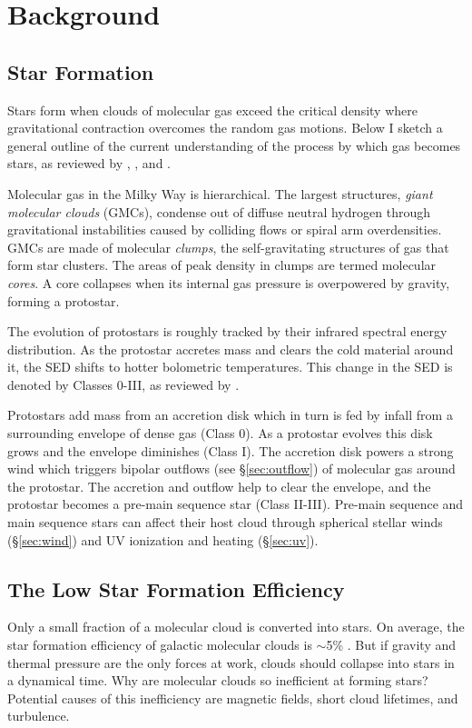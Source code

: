 \section{Background}\label{sec:bkgrd}

\subsection{Star Formation}\label{sec:sf}
Stars form when clouds of molecular gas exceed the critical density where gravitational contraction overcomes the random gas motions. Below I sketch a general outline of the current understanding of the process by which gas becomes stars, as reviewed by \cite{McKee_2007}, \cite{Draine11}, and \cite{Dunham_2014}. 

Molecular gas in the Milky Way is hierarchical. The largest structures, \textit{giant molecular clouds} (GMCs), condense out of diffuse neutral hydrogen through gravitational instabilities caused by colliding flows or spiral arm overdensities. GMCs are made of molecular \textit{clumps}, the self-gravitating structures of gas that form star clusters. The areas of peak density in clumps are termed molecular \textit{cores}. A core collapses when its internal gas pressure is overpowered by gravity, forming a protostar.

The evolution of protostars is roughly tracked by their infrared spectral energy distribution. As the protostar accretes mass and clears the cold material around it, the SED shifts to hotter bolometric temperatures. This change in the SED is denoted by Classes 0-III, as reviewed by \cite{Andre00}.

Protostars add mass from an accretion disk which in turn is fed by infall from a surrounding envelope of dense gas (Class 0). As a protostar evolves this disk grows and the envelope diminishes (Class I). The accretion disk powers a strong wind which triggers bipolar outflows (see \S\ref{sec:outflow}) of molecular gas around the protostar. The accretion and outflow help to clear the envelope, and the protostar becomes a pre-main sequence star (Class II-III). Pre-main sequence and main sequence stars can affect their host cloud through spherical stellar winds (\S\ref{sec:wind}) and UV ionization and heating (\S\ref{sec:uv}).

\subsection{The Low Star Formation Efficiency}\label{sec:sfe}
Only a small fraction of a molecular cloud is converted into stars. On average, the star formation efficiency of galactic molecular clouds is $\sim$5\% \cite{McKee_2007}. But if gravity and thermal pressure are the only forces at work, clouds should collapse into stars in a dynamical time. Why are molecular clouds so inefficient at forming stars? Potential causes of this inefficiency are magnetic fields, short cloud lifetimes, and turbulence. 


